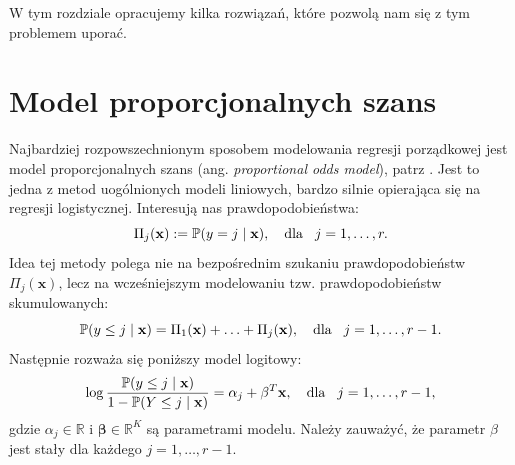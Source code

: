 \documentclass{mini}
\begin{document}
W tym rozdziale opracujemy kilka rozwiązań, które pozwolą nam się z tym problemem uporać.

\section{Model proporcjonalnych szans}

Najbardziej rozpowszechnionym sposobem modelowania regresji porządkowej jest model proporcjonalnych szans (ang. \textit{proportional odds model}), patrz \cite{pom}. Jest to jedna z metod uogólnionych modeli liniowych, bardzo silnie opierająca się na regresji logistycznej. Interesują nas prawdopodobieństwa: 
$$
\Pi_j(\mathbf{x}):=\mathbb{P}(y=j\hspace{1mm}|\hspace{1mm}\mathbf{x}),\quad \textrm{dla}\hspace{3mm} j=1,\ldots,r.
$$
Idea tej metody polega nie na bezpośrednim szukaniu prawdopodobieństw $\Pi_j(\mathbf{x})$, lecz na wcześniejszym modelowaniu tzw. prawdopodobieństw skumulowanych:
$$
\mathbb{P}(y\leq j \hspace{1mm}|\hspace{1mm} \mathbf{x})=\Pi_1(\mathbf{x})+\ldots+\Pi_j(\mathbf{x}),\quad \textrm{dla}\hspace{3mm} j=1,\ldots,r-1.
$$
Następnie rozważa się poniższy model logitowy:
$$
\log\dfrac{\mathbb{P}(y\leq j \hspace{1mm}|\hspace{1mm} \mathbf{x})}{1 - \mathbb{P}(Y\leq j \hspace{1mm}|\hspace{1mm} \mathbf{x})} = \alpha_j+\mathbf{\beta}^T\mathbf{x},\quad \textrm{dla}\hspace{3mm} j=1,\ldots,r-1,
$$
gdzie $\alpha_j\in \mathbb{R}$ i $\mathbf{\beta}\in \mathbb{R}^K$ są parametrami modelu. Należy zauważyć, że parametr $\beta$ jest stały dla każdego $j=1, \ldots, r-1$.
\end{document}
